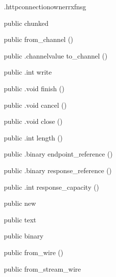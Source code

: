 \begin{CrexxClass}{.httpconnectionowner}{rxfnsg}
\begin{Members}
    \Factory
      {public}
      {chunked}
      {}

    \Factory
      {public}
      {from\_channel}
      {()}

    \Method
      {public}
      {.channelvalue}
      {to\_channel}
      {()}

    \Method
      {public}
      {.int}
      {write}
      {}

    \Method
      {public}
      {.void}
      {finish}
      {()}

    \Method
      {public}
      {.void}
      {cancel}
      {()}

    \Method
      {public}
      {.void}
      {close}
      {()}

    \Method
      {public}
      {.int}
      {length}
      {()}

    \Method
      {public}
      {.binary}
      {endpoint\_reference}
      {()}

    \Method
      {public}
      {.binary}
      {response\_reference}
      {()}

    \Method
      {public}
      {.int}
      {response\_capacity}
      {()}

    \Factory
      {public}
      {new}
      {}

    \Factory
      {public}
      {text}
      {}

    \Factory
      {public}
      {binary}
      {}

    \Factory
      {public}
      {from\_wire}
      {()}

    \Factory
      {public}
      {from\_stream\_wire}
      {}


\end{Members}
\end{CrexxClass}
